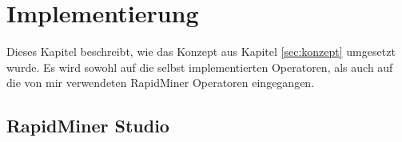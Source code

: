%
\chapter{Implementierung}
\label{sec:impl}
Dieses Kapitel beschreibt, wie das Konzept aus Kapitel \ref{sec:konzept} umgesetzt wurde. Es wird sowohl auf die selbst implementierten Operatoren, als auch auf die von mir verwendeten RapidMiner Operatoren eingegangen. 

\section{RapidMiner Studio}
\label{sec:impl:rms}